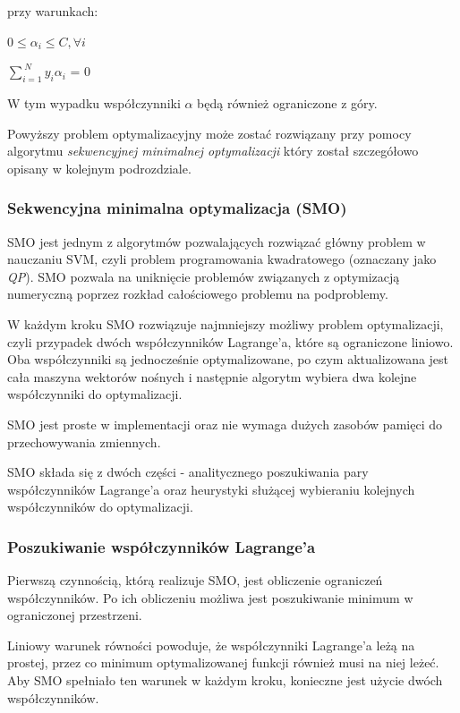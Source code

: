 \documentclass[[10pt,a4paper]{article}
\begin{document}
\vspace{5mm} przy warunkach:

\vspace{5mm}\centerline {$0 \leq \alpha_i \leq C, \forall i$ }

\vspace{5mm}\centerline {$\sum_{i=1}^{\ N} y_i \alpha_i$ = 0 }

\vspace{5mm} W tym wypadku współczynniki $\alpha$ będą również ograniczone z góry. 

\vspace{5mm} Powyższy problem optymalizacyjny może zostać rozwiązany przy pomocy algorytmu \textit{sekwencyjnej minimalnej optymalizacji} który został szczegółowo opisany w kolejnym podrozdziale. 

\newpage
\subsubsection{Sekwencyjna minimalna optymalizacja (SMO)}
SMO jest jednym z algorytmów pozwalających rozwiązać główny problem w nauczaniu SVM, czyli problem programowania kwadratowego (oznaczany jako \textit{QP}). SMO pozwala na uniknięcie problemów związanych z optymizacją numeryczną poprzez rozkład  całościowego problemu na podproblemy.


W każdym kroku SMO rozwiązuje najmniejszy możliwy problem optymalizacji, czyli przypadek dwóch współczynników Lagrange'a, które są ograniczone liniowo. Oba współczynniki są jednocześnie optymalizowane, po czym aktualizowana jest cała maszyna wektorów nośnych i następnie algorytm wybiera dwa kolejne współczynniki do optymalizacji.


SMO jest proste w implementacji oraz nie wymaga dużych zasobów pamięci do przechowywania zmiennych.


SMO składa się z dwóch części - analitycznego poszukiwania pary współczynników Lagrange'a oraz heurystyki służącej wybieraniu kolejnych współczynników do optymalizacji.

\subsubsection{Poszukiwanie współczynników Lagrange'a}

Pierwszą czynnością, którą realizuje SMO, jest obliczenie ograniczeń współczynników. Po ich obliczeniu możliwa jest poszukiwanie minimum w ograniczonej przestrzeni. 

Liniowy warunek równości powoduje, że współczynniki Lagrange'a leżą na prostej, przez co minimum optymalizowanej funkcji również musi na niej leżeć.
Aby SMO spełniało ten warunek w każdym kroku, konieczne jest użycie dwóch współczynników.
\end{document}
